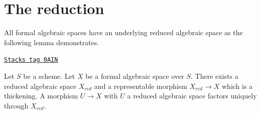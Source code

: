\section{The reduction}
\label{formal-spaces-section-reduction}
All formal algebraic spaces have an underlying
reduced algebraic space as the following lemma demonstrates.

\begin{lemma}
\label{formal-spaces-lemma-reduction-formal-algebraic-space}
\href{https://stacks.math.columbia.edu/tag/0AIN}{\texttt{Stacks tag 0AIN}}

Let $S$ be a scheme. Let $X$ be a formal algebraic space over $S$.
There exists a reduced algebraic space $X_{red}$ and a representable
morphism $X_{red} \to X$ which is a thickening. A morphism $U \to X$
with $U$ a reduced algebraic space factors uniquely through $X_{red}$.
\end{lemma}

